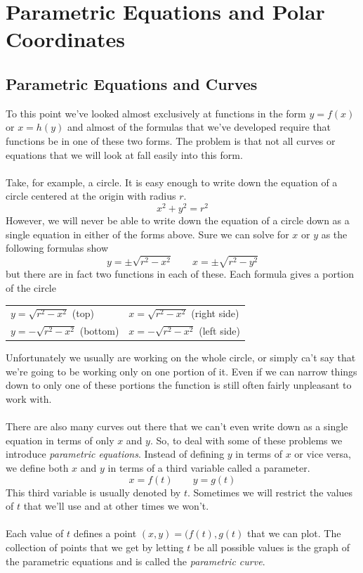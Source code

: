 \documentclass[10pt,reqno]{book}
\theoremstyle{definition}
\begin{document}
	\chapter{Parametric Equations and Polar Coordinates}
	
	\section{Parametric Equations and Curves}
	
	To this point we've looked almost exclusively at functions in the form $ y = f(x) $ or $ x = h(y) $ and almost of the formulas that we've developed require that functions be in one of these two forms. The problem is that not all curves or equations that we will look at fall easily into this form.\\ \\
	Take, for example, a circle. It is easy enough to write down the equation of a circle centered at the origin with radius $ r $.
	\[ x^2 + y^2 = r^2 \]
	However, we will never be able to write down the equation of a circle down as a single equation in either of the forms above. Sure we can solve for $ x $ or $ y $ as the following formulas show
	\[ y = \pm \sqrt{r^2 - x^2} \qquad x = \pm \sqrt{r^2 - y^2} \]
	but there are in fact two functions in each of these. Each formula gives a portion of the circle
	
	\begin{center}
		\begin{tabular}{ll}
			$ y = \sqrt{r^2 - x^2} $ (top) & $ x = \sqrt{r^2 - x^2} $ (right side) \\[3ex]
			$ y = -\sqrt{r^2 - x^2} $ (bottom) & $ x = -\sqrt{r^2 - x^2} $ (left side)
		\end{tabular}
	\end{center}
	Unfortunately we usually are working on the whole circle, or simply ca't say that we're going to be working only on one portion of it. Even if we can narrow things down to only one of these portions the function is still often fairly unpleasant to work with.\\ \\
	There are also many curves out there that we can't even write down as a single equation in terms of only $ x $ and $ y $. So, to deal with some of these problems we introduce \textit{parametric equations}. Instead of defining $ y $ in terms of $ x $ or vice versa, we define both $ x $ and $ y $ in terms of a third variable called a parameter.
	\[ x = f(t) \qquad y = g(t) \]
	This third variable is usually denoted by $ t $. Sometimes we will restrict the values of $ t $ that we'll use and at other times we won't.\\ \\
	Each value of $ t $ defines a point $ (x,y) = (f(t),g(t) $ that we can plot. The collection of points that we get by letting $ t $ be all possible values is the graph of the parametric equations and is called the \textit{parametric curve}.
	
\end{document}
